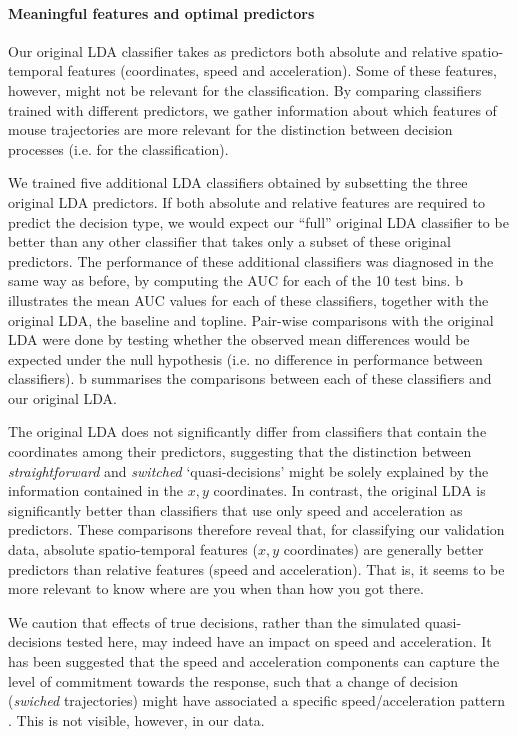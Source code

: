\documentclass{article}
\begin{document}
\paragraph{Meaningful features and optimal predictors}
Our original LDA classifier takes as predictors both absolute and relative spatio-temporal features (coordinates, speed and acceleration).
Some of these features, however, might not be relevant for the classification. 
By comparing classifiers trained with different predictors, we gather information about which features of mouse trajectories are more relevant for the distinction between decision processes (i.e. for the classification). 

We trained five additional LDA classifiers obtained by subsetting the three original LDA predictors. If both absolute and relative features are required to predict the decision type, we would expect our ``full'' original LDA classifier to be better than any other classifier that takes only a subset of these original predictors. 
The performance of these additional classifiers was diagnosed in the same way as before, by computing the AUC for each of the 10 test bins. b illustrates the mean AUC values for each of these classifiers, together with the original LDA, the baseline and topline. 
Pair-wise comparisons with the original LDA were done by testing whether the observed mean differences would be expected under the null hypothesis (i.e. no difference in performance between classifiers). b summarises the comparisons between each of these classifiers and our original LDA. 	

The original LDA does not significantly differ from classifiers that contain the coordinates among their predictors, suggesting that the distinction between \emph{straightforward} and \emph{switched} `quasi-decisions' might be solely explained by the information contained in the $x,y$ coordinates. 
In contrast, the original LDA is significantly better than classifiers that use only speed and acceleration as predictors. These comparisons therefore reveal that, for classifying our validation data, absolute spatio-temporal features ($x,y$ coordinates) are generally better predictors than relative features (speed and acceleration). That is, it seems to be more relevant to know where are you when than how you got there. 

We caution that effects of true decisions, rather than the simulated quasi-decisions tested here, may indeed have an impact on speed and acceleration. It has been suggested that the speed and acceleration components can capture the level of commitment towards the response, such that a change of decision (\textit{swiched} trajectories) might have associated a specific speed/acceleration pattern \citep{Hehman2014}. This is not visible, however, in our data.
\end{document}
